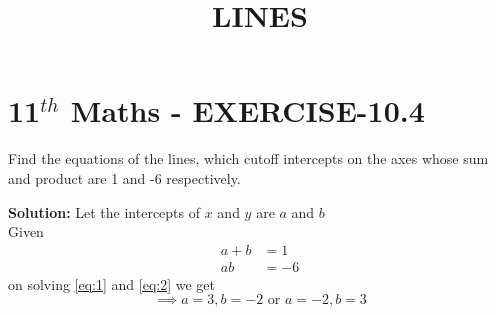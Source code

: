 \documentclass[10pt]{article}
\newcommand{\solution}{\noindent \textbf{Solution: }}
\begin{document}
\begin{center}
\title{\textbf{LINES}}
\date{\vspace{-5ex}} %
\maketitle
\end{center}

\section*{11$^{th}$ Maths - EXERCISE-10.4}

Find the  equations of the lines, which cutoff intercepts on the axes  whose sum and product are 1 and -6 respectively.

\solution
Let the intercepts of $x$ and $y$ are $a$ and $b$\\
Given
\begin{align}
a+b&=1
\label{eq:1}\\
ab&=-6
\label{eq:2}
\end{align} 
on solving \eqref{eq:1} and \eqref{eq:2} we get\\
$$\implies a=3,b=-2 \text{ or }   a=-2,b=3$$\\
\end{document}
